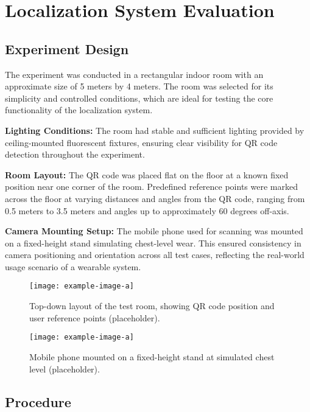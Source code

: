 \section{Localization System Evaluation}

\subsection{Experiment Design}

The experiment was conducted in a rectangular indoor room with an approximate size of 5 meters by 4 meters. The room was selected for its simplicity and controlled conditions, which are ideal for testing the core functionality of the localization system.

\textbf{Lighting Conditions:}  
The room had stable and sufficient lighting provided by ceiling-mounted fluorescent fixtures, ensuring clear visibility for QR code detection throughout the experiment.

\textbf{Room Layout:}  
The QR code was placed flat on the floor at a known fixed position near one corner of the room. Predefined reference points were marked across the floor at varying distances and angles from the QR code, ranging from 0.5 meters to 3.5 meters and angles up to approximately 60 degrees off-axis.

\textbf{Camera Mounting Setup:}  
The mobile phone used for scanning was mounted on a fixed-height stand simulating chest-level wear. This ensured consistency in camera positioning and orientation across all test cases, reflecting the real-world usage scenario of a wearable system.

\begin{figure}[h]
	\centering
	\texttt{[image: example-image-a]}
	\caption{Top-down layout of the test room, showing QR code position and user reference points (placeholder).}
	\label{fig:room_layout}
\end{figure}

\begin{figure}[h]
	\centering
	\texttt{[image: example-image-a]}
	\caption{Mobile phone mounted on a fixed-height stand at simulated chest level (placeholder).}
	\label{fig:camera_mount}
\end{figure}



\subsection{Procedure}

